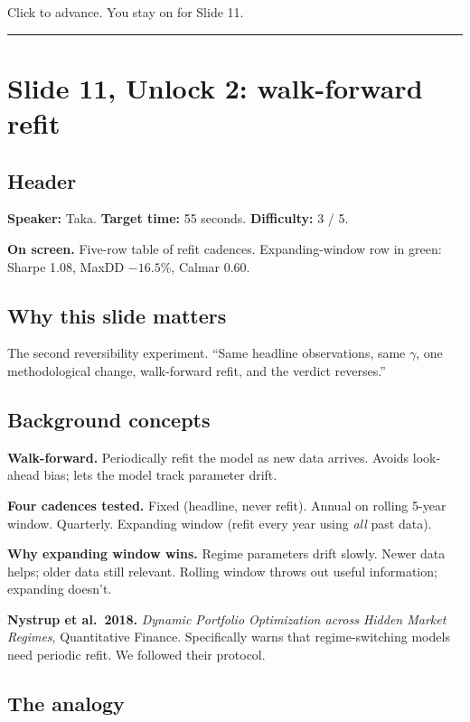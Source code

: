 \documentclass[11pt]{article}
\begin{document}
Click to advance. You stay on for Slide 11.

\bigskip\hrule

\section*{Slide 11, Unlock 2: walk-forward refit}

\subsection*{Header}

\textbf{Speaker:} Taka. \quad\textbf{Target time:} 55 seconds. \quad\textbf{Difficulty:} 3 / 5.

\textbf{On screen.} Five-row table of refit cadences. Expanding-window row in green: Sharpe 1.08, MaxDD $-16.5\%$, Calmar 0.60.

\subsection*{Why this slide matters}

The second reversibility experiment. ``Same headline observations, same $\gamma$, one methodological change, walk-forward refit, and the verdict reverses.''

\subsection*{Background concepts}

\textbf{Walk-forward.} Periodically refit the model as new data arrives. Avoids look-ahead bias; lets the model track parameter drift.

\textbf{Four cadences tested.} Fixed (headline, never refit). Annual on rolling 5-year window. Quarterly. Expanding window (refit every year using \emph{all} past data).

\textbf{Why expanding window wins.} Regime parameters drift slowly. Newer data helps; older data still relevant. Rolling window throws out useful information; expanding doesn't.

\textbf{Nystrup et al.\ 2018.} \emph{Dynamic Portfolio Optimization across Hidden Market Regimes}, Quantitative Finance. Specifically warns that regime-switching models need periodic refit. We followed their protocol.

\subsection*{The analogy}
\end{document}
